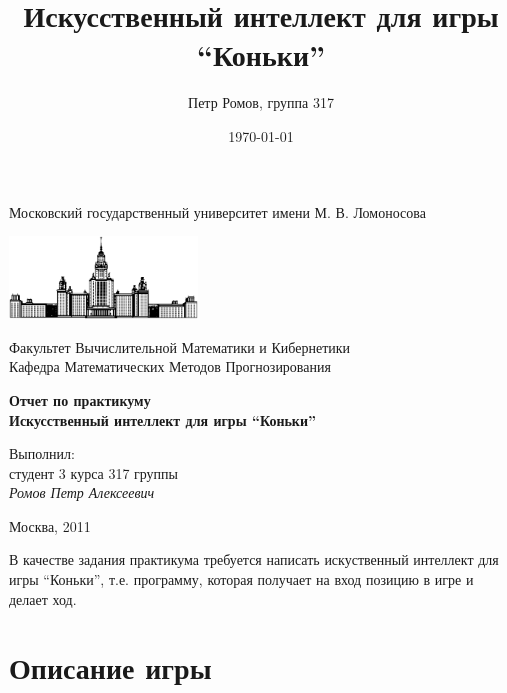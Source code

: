 \documentclass[a4paper]{article}
\title{Искусственный интеллект для игры ``Коньки''}
\author{Петр Ромов, группа 317}
\date{\today}
\begin{document}
\begin{titlepage}
\begin{center}
    Московский государственный университет имени М. В. Ломоносова

    \bigskip
    \includegraphics[width=50mm]{msu.eps}

    \bigskip
    Факультет Вычислительной Математики и Кибернетики\\
    Кафедра Математических Методов Прогнозирования\\[10mm]

    \bigskip
    \bigskip

    \textsf{\large\bfseries
        Отчет по практикуму\\[10mm]
	   Искусственный интеллект для игры ``Коньки''
    }\\[10mm]

    \begin{flushright}
        \parbox{0.5\textwidth}{
            Выполнил: \\
		  студент 3 курса 317 группы\\
            \emph{Ромов Петр Алексеевич}\\[5mm]
        }
    \end{flushright}

    \vspace{\fill}
    Москва, 2011
\end{center}
\end{titlepage}

В качестве задания практикума требуется написать искуственный интеллект для игры ``Коньки'', т.е. программу, которая получает на вход позицию в игре и делает ход. 

\section{Описание игры}
\end{document}
